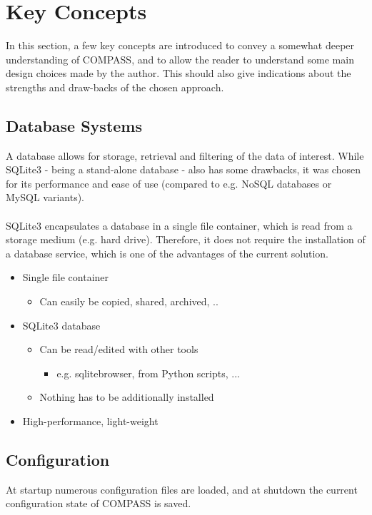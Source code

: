 \section{Key Concepts}
\label{sec:key_concepts}

In this section, a few key concepts are introduced to convey a somewhat deeper understanding of COMPASS, and to allow the reader to understand some main design choices made by the author. 
This should also give indications about the strengths and draw-backs of the chosen approach.

\subsection*{Database Systems}
A database allows for storage, retrieval and filtering of the data of interest. While SQLite3 - being a stand-alone database - also has some drawbacks, 
it was chosen for its performance and ease of use (compared to e.g. NoSQL databases or MySQL variants). \\\\
SQLite3 encapsulates a database in a single file container, which is read from a storage medium (e.g. hard drive). 
Therefore, it does not require the installation of a database service, which is one of the advantages of the current solution. \\

\begin{itemize}
\item Single file container
\begin{itemize}
\item Can easily be copied, shared, archived, ..
\end{itemize}
\item SQLite3 database
\begin{itemize}
\item Can be read/edited with other tools
\begin{itemize}
\item e.g. sqlitebrowser, from Python scripts, ...
\end{itemize}
\item Nothing has to be additionally installed
\end{itemize}
\item High-performance, light-weight
\end{itemize}

\subsection*{Configuration}
At startup numerous configuration files are loaded, and at shutdown the current configuration state of COMPASS is saved.\\\\

